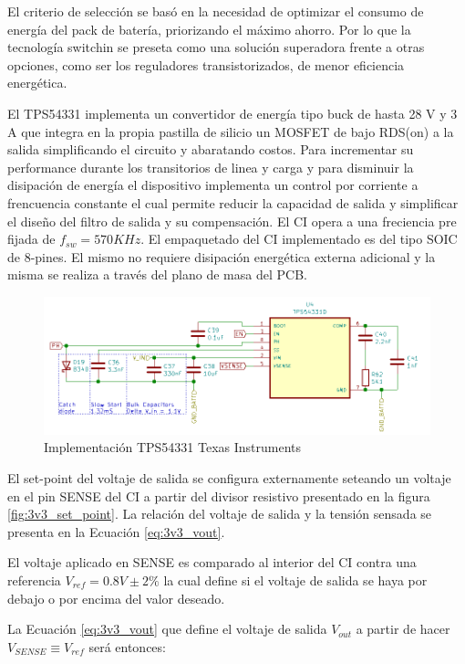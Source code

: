 \documentclass[10pt,a4paper]{article}
\begin{document}
El criterio de selección se basó en la necesidad de optimizar el consumo de
energía del pack de batería, priorizando el máximo ahorro. Por lo que la
tecnología switchin se preseta como una solución superadora frente a otras
opciones, como ser los reguladores transistorizados, de menor eficiencia
energética.

El TPS54331 implementa un convertidor de energía tipo buck de hasta 28 V y 3 A
que integra en la propia pastilla de silicio un MOSFET de bajo RDS(on) a la
salida simplificando el circuito y abaratando costos.
Para incrementar su performance durante los transitorios de linea y carga y para
disminuir la disipación de energía el dispositivo implementa un control por
corriente a frencuencia constante el cual permite reducir la capacidad de salida
y simplificar el diseño del filtro de salida y su compensación. El \acrshort{CI}
opera a una freciencia pre fijada de $f_{sw}=570 KHz$.
El empaquetado del \acrshort{CI} implementado es del tipo SOIC de 8-pines. El
mismo no requiere disipación energética externa adicional y la misma se realiza
a través del plano de masa del \acrshort{PCB}.

\begin{figure}[h!]
    \centering
    \includegraphics[width=0.8\linewidth]{hardware/3v3/3v3_IC.png}
        \caption{Implementación TPS54331 Texas Instruments}
        \label{fig:3v3_IC}
\end{figure}
\FloatBarrier

El set-point del voltaje de salida se configura externamente seteando un voltaje
en el pin SENSE del \acrshort{CI} a partir del divisor resistivo presentado en
la figura \ref{fig:3v3_set_point}. La relación del voltaje de salida y la
tensión sensada se presenta en la Ecuación \ref{eq:3v3_vout}.

El voltaje aplicado en SENSE es comparado al interior del \acrshort{CI} contra
una referencia $V_{ref} = 0.8 V \pm2\%$ la cual define si el voltaje de
salida se haya por debajo o por encima del valor deseado. 

La Ecuación \ref{eq:3v3_vout} que define el voltaje de salida $V_{out}$ a partir
de hacer $ V_{SENSE} \equiv V_{ref}$ será entonces:
\end{document}
